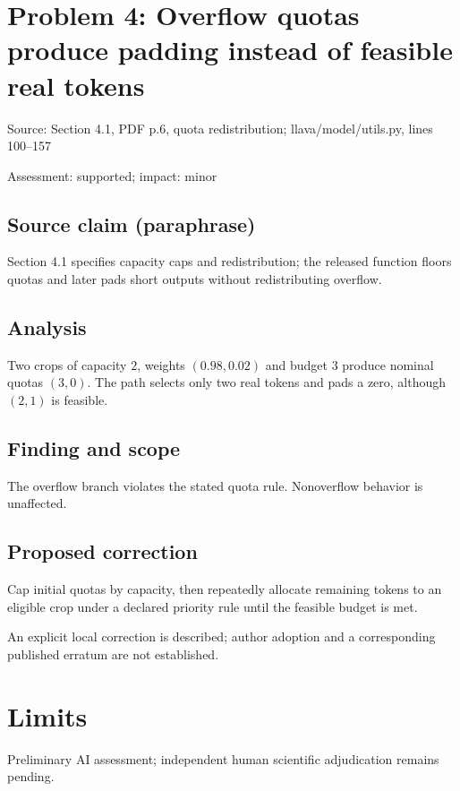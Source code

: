 \documentclass[11pt]{article}
\begin{document}
\section*{Problem 4: Overflow quotas produce padding instead of feasible real tokens}

Source: Section 4.1, PDF p.6, quota redistribution; llava/model/utils.py, lines 100–157

Assessment: supported; impact: minor

\subsection*{Source claim (paraphrase)}

Section 4.1 specifies capacity caps and redistribution; the released function floors quotas and later pads short outputs without redistributing overflow.

\subsection*{Analysis}

Two crops of capacity \(2\), weights \((0.98,0.02)\) and budget \(3\) produce nominal quotas \((3,0)\). The path selects only two real tokens and pads a zero, although \((2,1)\) is feasible.

\subsection*{Finding and scope}

The overflow branch violates the stated quota rule. Nonoverflow behavior is unaffected.

\subsection*{Proposed correction}

Cap initial quotas by capacity, then repeatedly allocate remaining tokens to an eligible crop under a declared priority rule until the feasible budget is met.

An explicit local correction is described; author adoption and a corresponding published erratum are not established.

\section*{Limits}

Preliminary AI assessment; independent human scientific adjudication remains pending.\par
\end{document}
